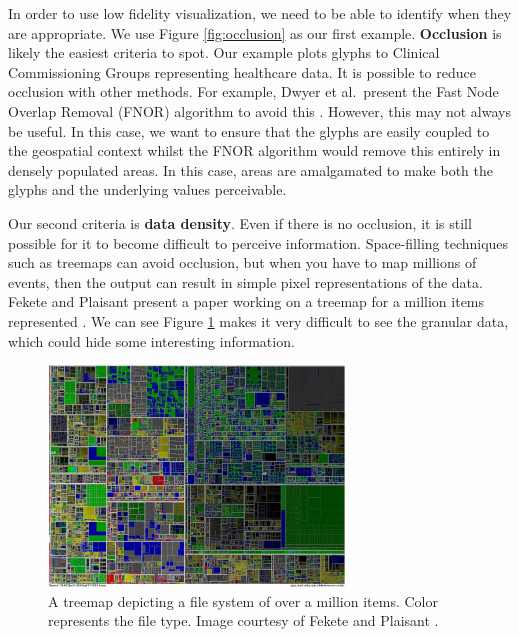 In order to use low fidelity visualization, we need to be able to identify when they are appropriate. We use Figure \ref{fig:occlusion} as our first example. \textbf{Occlusion} is likely the easiest criteria to spot. Our example plots glyphs to Clinical Commissioning Groups representing healthcare data. It is possible to reduce occlusion with other methods. For example, Dwyer et al.\ present the Fast Node Overlap Removal (FNOR) algorithm to avoid this \cite{dwyer2005fast}. However, this may not always be useful. In this case, we want to ensure that the glyphs are easily coupled to the geospatial context whilst the FNOR algorithm would remove this entirely in densely populated areas. In this case, areas are amalgamated to make both the glyphs and the underlying values perceivable.

Our second criteria is \textbf{data density}. Even if there is no occlusion, it is still possible for it to become difficult to perceive information. Space-filling techniques such as treemaps can avoid occlusion, but when you have to map millions of events, then the output can result in simple pixel representations of the data. Fekete and Plaisant present a paper working on a treemap for a million items represented \cite{fekete2002interactive}. We can see Figure \ref{fig:ch7treemap} makes it very difficult to see the granular data, which could hide some interesting information. 


\begin{figure}[t]
\includegraphics[width=0.7\textwidth]{images/ch7/treemap}
\caption{A treemap depicting a file system of over a million items. Color represents the file type. Image courtesy of Fekete and Plaisant \cite{dwyer2005fast}.} \label{fig:ch7treemap}
\end{figure}

